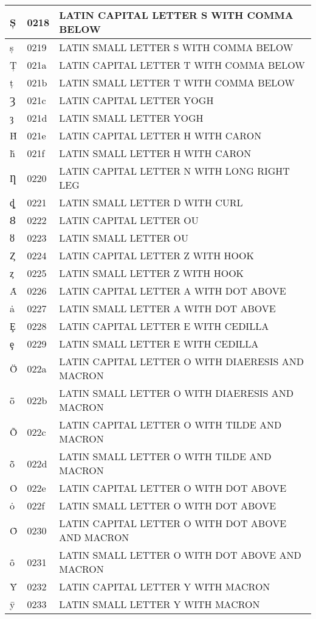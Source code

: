 \documentclass[12pt,letterpaper,openany]{book}
\begin{document}
\begin{center}
\begin{supertabular}{|m{0.25in}|m{0.5in}|m{4in}|}
Ș & 0218 & LATIN CAPITAL LETTER S WITH COMMA BELOW\\\hline
ș & 0219 & LATIN SMALL LETTER S WITH COMMA BELOW\\\hline
Ț & 021a & LATIN CAPITAL LETTER T WITH COMMA BELOW\\\hline
ț & 021b & LATIN SMALL LETTER T WITH COMMA BELOW\\\hline
Ȝ & 021c & LATIN CAPITAL LETTER YOGH\\\hline
ȝ & 021d & LATIN SMALL LETTER YOGH\\\hline
Ȟ & 021e & LATIN CAPITAL LETTER H WITH CARON\\\hline
ȟ & 021f & LATIN SMALL LETTER H WITH CARON\\\hline
Ƞ & 0220 & LATIN CAPITAL LETTER N WITH LONG RIGHT LEG\\\hline
ȡ & 0221 & LATIN SMALL LETTER D WITH CURL\\\hline
Ȣ & 0222 & LATIN CAPITAL LETTER OU\\\hline
ȣ & 0223 & LATIN SMALL LETTER OU\\\hline
Ȥ & 0224 & LATIN CAPITAL LETTER Z WITH HOOK\\\hline
ȥ & 0225 & LATIN SMALL LETTER Z WITH HOOK\\\hline
Ȧ & 0226 & LATIN CAPITAL LETTER A WITH DOT ABOVE\\\hline
ȧ & 0227 & LATIN SMALL LETTER A WITH DOT ABOVE\\\hline
Ȩ & 0228 & LATIN CAPITAL LETTER E WITH CEDILLA\\\hline
ȩ & 0229 & LATIN SMALL LETTER E WITH CEDILLA\\\hline
Ȫ & 022a & LATIN CAPITAL LETTER O WITH DIAERESIS AND MACRON\\\hline
ȫ & 022b & LATIN SMALL LETTER O WITH DIAERESIS AND MACRON\\\hline
Ȭ & 022c & LATIN CAPITAL LETTER O WITH TILDE AND MACRON\\\hline
ȭ & 022d & LATIN SMALL LETTER O WITH TILDE AND MACRON\\\hline
Ȯ & 022e & LATIN CAPITAL LETTER O WITH DOT ABOVE\\\hline
ȯ & 022f & LATIN SMALL LETTER O WITH DOT ABOVE\\\hline
Ȱ & 0230 & LATIN CAPITAL LETTER O WITH DOT ABOVE AND MACRON\\\hline
ȱ & 0231 & LATIN SMALL LETTER O WITH DOT ABOVE AND MACRON\\\hline
Ȳ & 0232 & LATIN CAPITAL LETTER Y WITH MACRON\\\hline
ȳ & 0233 & LATIN SMALL LETTER Y WITH MACRON\\\hline

\end{supertabular}
\end{center}
\end{document}
